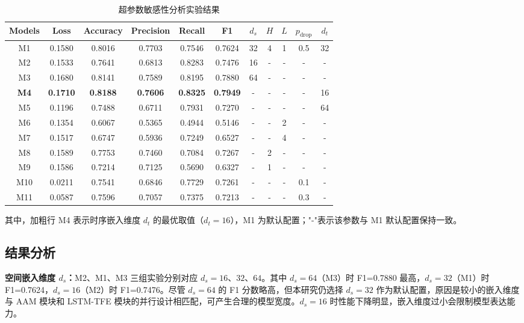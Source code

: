 \begin{table}[htbp]
\centering
\caption{超参数敏感性分析实验结果}
\label{tab:hyperparameter_sensitivity}
\begin{tabular}{c|ccccc|ccccc}
\toprule
Models & Loss & Accuracy & Precision & Recall & F1 & $d_s$ & $H$ & $L$ & $p_\text{drop}$ & $d_t$ \\
\midrule
M1 & 0.1580 & 0.8016 & 0.7703 & 0.7546 & 0.7624 & 32 & 4 & 1 & 0.5 & 32 \\
M2 & 0.1533 & 0.7641 & 0.6813 & 0.8283 & 0.7476 & 16 & - & - & - & - \\
M3 & 0.1680 & 0.8141 & 0.7589 & 0.8195 & 0.7880 & 64 & - & - & - & - \\
\textbf{M4} & \textbf{0.1710} & \textbf{0.8188} & \textbf{0.7606} & \textbf{0.8325} & \textbf{0.7949} & - & - & - & - & 16 \\
M5 & 0.1196 & 0.7488 & 0.6711 & 0.7931 & 0.7270 & - & - & - & - & 64 \\
M6 & 0.1354 & 0.6067 & 0.5365 & 0.4944 & 0.5146 & - & - & 2 & - & - \\
M7 & 0.1517 & 0.6747 & 0.5936 & 0.7249 & 0.6527 & - & - & 4 & - & - \\
M8 & 0.1589 & 0.7753 & 0.7460 & 0.7084 & 0.7267 & - & 2 & - & - & - \\
M9 & 0.1586 & 0.7214 & 0.7125 & 0.5690 & 0.6327 & - & 1 & - & - & - \\
M10 & 0.0211 & 0.7541 & 0.6846 & 0.7729 & 0.7261 & - & - & - & 0.1 & - \\
M11 & 0.0587 & 0.7596 & 0.7057 & 0.7375 & 0.7213 & - & - & - & 0.3 & - \\
\bottomrule
\end{tabular}
\end{table}

其中，加粗行 M4 表示时序嵌入维度 $d_t$ 的最优取值（$d_t=16$），M1 为默认配置；"-"表示该参数与 M1 默认配置保持一致。

\subsection{结果分析}

\textbf{空间嵌入维度 $d_s$：}M2、M1、M3 三组实验分别对应 $d_s=16$、$32$、$64$。其中 $d_s=64$（M3）时 F1=0.7880 最高，$d_s=32$（M1）时 F1=0.7624，$d_s=16$（M2）时 F1=0.7476。尽管 $d_s=64$ 的 F1 分数略高，但本研究仍选择 $d_s=32$ 作为默认配置，原因是较小的嵌入维度与 AAM 模块和 LSTM-TFE 模块的并行设计相匹配，可产生合理的模型宽度。$d_s=16$ 时性能下降明显，嵌入维度过小会限制模型表达能力。

